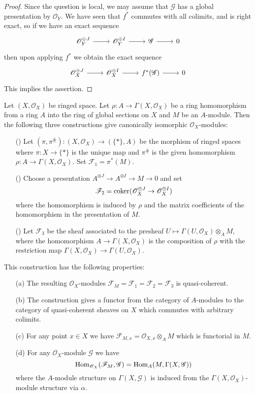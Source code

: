 \begin{proof}
Since the question is local, we may assume that $\mathscr{G}$ has a global presentation by $\mathscr{O}_Y$. We have seen that $f^*$ commutes with all colimits, and is right exact, so if we have an exact sequence
\[\begin{tikzcd}
\mathscr{O}_Y^{\oplus J}\ar[r]&\mathscr{O}_Y^{\oplus I}\ar[r]&\mathscr{G}\ar[r]&0
\end{tikzcd}\]
then upon applying $f^*$ we obtain the exact sequence
\[\begin{tikzcd}
\mathscr{O}_X^{\oplus J}\ar[r]&\mathscr{O}_X^{\oplus I}\ar[r]&f^*(\mathscr{G})\ar[r]&0
\end{tikzcd}\]
This implies the assertion.
\end{proof}
\begin{proposition}\label{qcoh module associated with a module}
Let $(X,\mathscr{O}_X)$ be ringed space. Let $\rho:A\to\Gamma(X,\mathscr{O}_X)$ be a ring homomorphism from a ring $A$ into the ring of global sections on $X$ and $M$ be an $A$-module. Then the following three constructions give canonically isomorphic $\mathscr{O}_X$-modules:
\begin{itemize}
\item[(\rmnum{1})] Let $(\pi,\pi^{\hash}):(X,\mathscr{O}_X)\to(\{\ast\},A)$ be the morphism of ringed spaces where $\pi:X\to\{\ast\}$ is the unique map and $\pi^{\hash}$ is the given homomorphism $\rho:A\to\Gamma(X,\mathscr{O}_X)$. Set $\mathscr{F}_1=\pi^*(M)$.
\item[(\rmnum{2})] Choose a presentation $A^{\oplus J}\to A^{\oplus I}\to M\to 0$ and set
\[\mathscr{F}_2=\operatorname{coker}(\mathscr{O}_X^{\oplus J}\to\mathscr{O}_X^{\oplus I})\]
where the homomorphism is induced by $\rho$ and the matrix coefficients of the homomorphism in the presentation of $M$.
\item[(\rmnum{3})] Let $\mathscr{F}_3$ be the sheaf associated to the presheaf $U\mapsto\Gamma(U,\mathscr{O}_X)\otimes_AM$, where the homomorphism $A\to\Gamma(X,\mathscr{O}_X)$ is the composition of $\rho$ with the restriction map $\Gamma(X,\mathscr{O}_X)\to\Gamma(U,\mathscr{O}_X)$.
\end{itemize}
This construction has the following properties:
\begin{itemize}
\item[(a)] The resulting $\mathscr{O}_X$-modules $\mathscr{F}_M=\mathscr{F}_1=\mathscr{F}_2=\mathscr{F}_3$ is quasi-coherent.
\item[(b)] The construction gives a functor from the category of $A$-modules to the category of quasi-coherent sheaves on $X$ which commutes with arbitrary colimits.
\item[(c)] For any point $x\in X$ we have $\mathscr{F}_{M,x}=\mathscr{O}_{X,x}\otimes_AM$ which is functorial in $M$.
\item[(d)] For any $\mathscr{O}_X$-module $\mathscr{G}$ we have
\[\mathrm{Hom}_{\mathscr{O}_X}(\mathscr{F}_M,\mathscr{G})=\mathrm{Hom}_A(M,\Gamma(X,\mathscr{G}))\]
where the $A$-module structure on $\Gamma(X,\mathscr{G})$ is induced from the $\Gamma(X,\mathscr{O}_X)$-module structure via $\alpha$.
\end{itemize}
\end{proposition}
